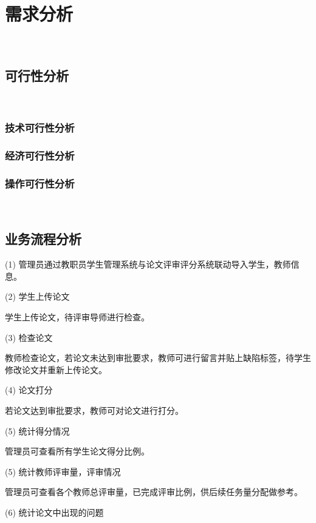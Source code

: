 
\chapter{需求分析}
\label{chap07}
~\\
\section{可行性分析}
~\\
\subsection{技术可行性分析}
\subsection{经济可行性分析}
\subsection{操作可行性分析}
~\\
\section{业务流程分析}

 (1) 管理员通过教职员学生管理系统与论文评审评分系统联动导入学生，教师信息。

(2) 学生上传论文

学生上传论文，待评审导师进行检查。
~\cite[p.~148]{.2019}
~\cite[p.~22]{master1}

(3) 检查论文

教师检查论文，若论文未达到审批要求，教师可进行留言并贴上缺陷标签，待学生修改论文并重新上传论文。

(4) 论文打分

若论文达到审批要求，教师可对论文进行打分。

(5) 统计得分情况

管理员可查看所有学生论文得分比例。

(5) 统计教师评审量，评审情况

管理员可查看各个教师总评审量，已完成评审比例，供后续任务量分配做参考。

(6) 统计论文中出现的问题

